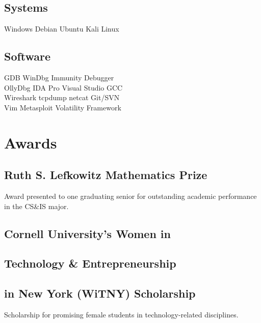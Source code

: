 \documentclass[10pt,letterpaper]{clar-resume}
\begin{document}
\begin{minipage}[t]{0.33\textwidth}
\smallspace

\subsection{Systems}
Windows \textbullet{} Debian \textbullet{} Ubuntu \textbullet{} Kali Linux

\smallspace

\subsection{Software}
GDB \textbullet{} WinDbg \textbullet{} Immunity Debugger \\ 
OllyDbg \textbullet{} IDA Pro \textbullet{} Visual Studio \textbullet{} GCC \\ 
Wireshark \textbullet{} tcpdump \textbullet{} netcat \textbullet{} Git/SVN \\
Vim \textbullet{} Metasploit \textbullet{} Volatility Framework

\sectionspace


\section{Awards} 

\subsection{Ruth S. Lefkowitz Mathematics Prize}
Award presented to one graduating senior for outstanding academic performance in the CS\&IS major.

\smallspace

\subsection{Cornell University's Women in}
\subsection{Technology \& Entrepreneurship}
\subsection{in New York (WiTNY) Scholarship}
Scholarship for promising female students in technology-related disciplines.


\end{minipage}
\end{document}
